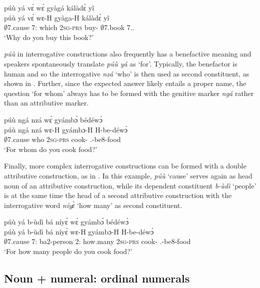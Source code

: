 \ea\label{puuyave}
 \glll  púù yá vɛ́ wɛ́ gyàgá kálàdɛ̀ yî \\
púù yá vɛ́ wɛ-H gyàga-H kálàdɛ̀ yî \\
          $\emptyset$7.cause 7:{\ATT} which 2\textsc{sg}-\textsc{prs} buy-{\R} $\emptyset$7.book 7.{\DEM}.{\PROX}  \\
    \trans `Why do you buy this book?'
\z

{\itshape púù} in interrogative constructions also frequently has a benefactive meaning and speakers  spontaneously translate {\itshape púù yá} as `for'. Typically, the benefactor is human and so the interrogative {\itshape nzá} `who' is then used as second constituent, as shown in . Further, since the expected answer likely entails a proper name, the question  `for whom' always has to be formed with the genitive marker {\itshape ngá} rather than an attributive marker. 

\ea\label{puunga}
 \glll  púù ngá nzá wɛ́ gyámbɔ́ bédéwɔ̀ \\
   púù ngá nzá wɛ-H gyámbɔ-H H-be-déwɔ̀ \\
          $\emptyset$7.cause {\GEN} who 2\textsc{sg}-\textsc{prs} cook-{\R} {\OBJ}.{\LINK}-be8-food\\
    \trans `For whom do you cook food?'
\z

Finally,  more complex interrogative constructions can be formed with a double attributive construction, as in . In this example, {\itshape púù} `cause' serves again as head noun of an attributive construction, while its dependent constituent {\itshape b-ùdì} `people' is at the same time the head of a second attributive construction with the interrogative word {\itshape níyɛ̀} `how many' as second constituent.

\ea\label{puuniye}
 \glll  púù yá b-ùdì bá níyɛ̀ wɛ́ gyámbɔ́ bédéwɔ̀ \\
    púù yá b-ùdì bá níyɛ̀ wɛ-H gyámbɔ-H H-be-déwɔ̀ \\
          $\emptyset$7.cause 7:{\ATT} ba2-person 2:{\ATT} how.many 2\textsc{sg}-\textsc{prs} cook-{\R} {\OBJ}.{\LINK}-be8-food~~~~~\\
    \trans `For how many people do you cook food?'
\z


\subsection{Noun + numeral: ordinal numerals}
\label{sec:Ord}

